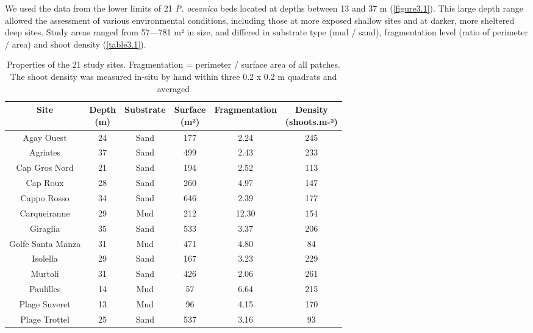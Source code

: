 We used the data from the lower limits of 21 \textit{P. oceanica} beds located at depths between 13 and 37 m (\autoref{figure3.1}). This large depth range allowed the assessment of various environmental conditions, including those at more exposed shallow sites and at darker, more sheltered deep sites. Study areas ranged from 57---781 m² in size, and differed in substrate type (mud / sand), fragmentation level (ratio of perimeter / area) and shoot density (\autoref{table3.1}).

\begin{table}[H]
  \centering
  \normalsize
  \caption[Properties of the 21 study sites]{Properties of the 21 study sites. Fragmentation = perimeter / surface area of all patches. The shoot density was measured in-situ by hand within three 0.2 x 0.2 m quadrats and averaged}
  \label{table3.1}
    \begin{tabular}{*{6}{c}}
        \toprule
        \textbf{Site} & \makecell{\textbf{Depth} \\ \textbf{(m)}} & \textbf{Substrate} & \makecell{\textbf{Surface} \\ \textbf{(m²)}} & \textbf{Fragmentation} & \makecell{\textbf{Density} \\ \textbf{(shoots.m-²)}} \\ \midrule
        Agay Ouest & 24 & Sand & 177 & 2.24 & 245 \\
        Agriates & 37 & Sand & 499 & 2.43 & 233 \\
        Cap Gros Nord & 21 & Sand & 194 & 2.52 & 113 \\
        Cap Roux & 28 & Sand & 260 & 4.97 & 147 \\
        Cappo Rosso & 34 & Sand & 646 & 2.39 & 177 \\
        Carqueiranne & 29 & Mud & 212 & 12.30 & 154 \\
        Giraglia & 35 & Sand & 533 & 3.37 & 206 \\
        Golfe Santa Manza & 31 & Mud & 471 & 4.80 & 84 \\
        Isolella & 29 & Sand & 167 & 3.23 & 229 \\
        Murtoli & 31 & Sand & 426 & 2.06 & 261 \\
        Paulilles & 14 & Mud & 57 & 6.64 & 215 \\
        Plage Suveret & 13 & Mud & 96 & 4.15 & 170 \\
        Plage Trottel & 25 & Sand & 537 & 3.16 & 93 \\

\end{tabular}
\end{table}
